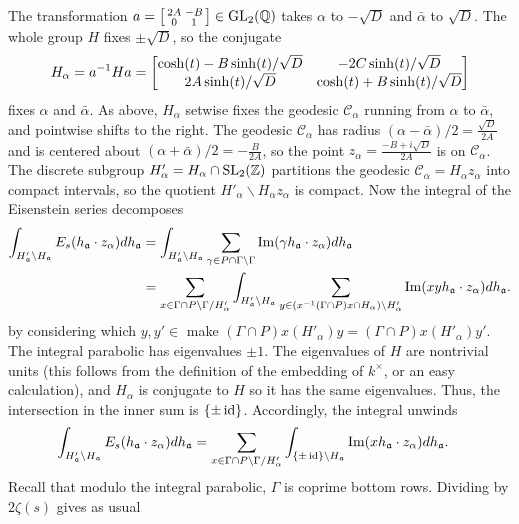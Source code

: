 \documentclass[11pt]{amsart}
\begin{document}
The transformation $a=\left[ \begin{smallmatrix} 2 A & -B \\ 0 & 1 \end{smallmatrix} \right]\in \operatorname{GL}_2(\mathbb{Q})$ takes $\alpha$ to $-\sqrt{D}$ and $\bar{\alpha}$ to $\sqrt{D}$. The whole group $H$ fixes $\pm \sqrt{D}$, so the conjugate
\begin{equation*}
H_\alpha=a^{-1} H a = \left[ \begin{matrix} \cosh(t)-B \sinh(t)/\sqrt{D} & -2C \sinh(t)/\sqrt{D} \\ 2A \sinh(t)/\sqrt{D} & \cosh(t)+B\sinh(t)/\sqrt{D} \end{matrix} \right]
\end{equation*}
fixes $\alpha$ and $\bar{\alpha}$. As above, $H_\alpha$  setwise fixes the geodesic $\mathcal{C}_\alpha$ running from $\alpha$ to $\bar{\alpha}$, and pointwise shifts to the right. The geodesic $\mathcal{C}_\alpha$ has radius $(\alpha-\bar{\alpha})/2=\frac{\sqrt{D}}{2A}$ and is centered about $(\alpha+\bar{\alpha})/2=-\frac{B}{2A}$, so the point $z_\alpha=\frac{-B+i\sqrt{D}}{2A}$ is on $\mathcal{C}_\alpha$. The discrete subgroup $H'_\alpha=H_\alpha \cap \operatorname{SL}_2(\mathbb{Z})$  partitions the geodesic $\mathcal{C}_\alpha=H_\alpha z_\alpha$ into compact intervals, so the quotient $H'_\alpha \backslash H_\alpha z_\alpha$ is compact. Now the integral of the Eisenstein series decomposes
\begin{align*}
\int_{H'_{\mathfrak{a}} \backslash H_{\mathfrak{a}}}E_s(h_{\mathfrak{a}} \cdot z_\alpha) dh_{\mathfrak{a}} & =\int_{H'_{\mathfrak{a}} \backslash H_{\mathfrak{a}}} \sum_{\gamma \in P \cap \Gamma \backslash \Gamma} \operatorname{Im} (\gamma h_{\mathfrak{a}} \cdot z_\alpha) dh_{\mathfrak{a}} \\
& = \sum_{x \in \Gamma \cap P \backslash \Gamma / H'_\alpha} \int_{H'_{\mathfrak{a}} \backslash H_{\mathfrak{a}}} \sum_{y \in (x^{-1} (\Gamma \cap P) x \cap H_\alpha) \backslash H'_\alpha} \operatorname{Im}(x y h_{\mathfrak{a}} \cdot z_\alpha) dh_{\mathfrak{a}}.
\end{align*}
by considering which $y,y'\in$ make $(\Gamma \cap P)x(H'_\alpha)y=(\Gamma \cap P)x(H'_\alpha)y'$. The integral parabolic has eigenvalues $\pm 1$. The eigenvalues of $H$ are nontrivial units (this follows from the definition of the embedding of $k^\times$, or an easy calculation), and $H_\alpha$ is conjugate to $H$ so it has the same eigenvalues. Thus, the intersection in the inner sum is $\{ \pm \operatorname{id} \}$. Accordingly, the integral unwinds
\begin{align*}
\int_{H'_{\mathfrak{a}} \backslash H_{\mathfrak{a}}}E_s(h_{\mathfrak{a}} \cdot z_\alpha) dh_{\mathfrak{a}}& =  \sum_{x \in \Gamma \cap P \backslash \Gamma / H'_\alpha} \int_{\{\pm \operatorname{id} \} \backslash H_{\mathfrak{a}}} \operatorname{Im}(x h_{\mathfrak{a}} \cdot z_\alpha) dh_{\mathfrak{a}}.
\end{align*}
Recall that modulo the integral parabolic, $\Gamma$ is coprime bottom rows. Dividing by $2\zeta(s)$ gives as usual 
\end{document}
